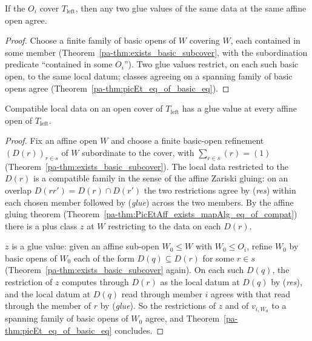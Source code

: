 \begin{theorem}
  \label{pa-thm:picEt_glueValue_unique}
  \leanok

  If the \(O_i\) cover \(T_{\mathrm{left}}\), then any two glue values of the same data at
  the same affine open agree.
\end{theorem}
\begin{proof}
  \leanok
  Choose a finite family of basic opens of \(W\) covering \(W\), each contained in some
  member (Theorem~\ref{pa-thm:exists_basic_subcover}, with the subordination predicate
  ``contained in some \(O_i\)''). Two glue values restrict, on each such basic open, to the
  same local datum; classes agreeing on a spanning family of basic opens agree
  (Theorem~\ref{pa-thm:picEt_eq_of_basic_eq}).
\end{proof}

\begin{theorem}
  \label{pa-thm:picEt_exists_isGlueValue}
  \leanok

  Compatible local data on an open cover of \(T_{\mathrm{left}}\) has a glue value at every
  affine open of \(T_{\mathrm{left}}\).
\end{theorem}
\begin{proof}
  \leanok
  Fix an affine open \(W\) and choose a finite basic-open refinement \((D(r))_{r \in s}\) of
  \(W\) subordinate to the cover, with \(\sum_{r \in s}(r) = (1)\)
  (Theorem~\ref{pa-thm:exists_basic_subcover}). The local data restricted to the \(D(r)\) is a
  compatible family in the sense of the affine Zariski gluing: on an overlap
  \(D(rr') = D(r) \cap D(r')\) the two restrictions agree by (\emph{res}) within each
  chosen member followed by (\emph{glue}) across the two members. By the affine gluing
  theorem (Theorem~\ref{pa-thm:PicEtAff_exists_mapAlg_eq_of_compat}) there is a plus class
  \(z\) at \(W\) restricting to the data on each \(D(r)\).

  \(z\) is a glue value: given an affine sub-open \(W_0 \le W\) with \(W_0 \le O_i\), refine
  \(W_0\) by basic opens of \(W_0\) each of the form \(D(q) \subseteq D(r)\) for some
  \(r \in s\) (Theorem~\ref{pa-thm:exists_basic_subcover} again). On each such \(D(q)\), the
  restriction of \(z\) computes through \(D(r)\) as the local datum at \(D(q)\) by
  (\emph{res}), and the local datum at \(D(q)\) read through member \(i\) agrees with that
  read through the member of \(r\) by (\emph{glue}). So the restrictions of \(z\) and of
  \(v_{i,W_0}\) to a spanning family of basic opens of \(W_0\) agree, and
  Theorem~\ref{pa-thm:picEt_eq_of_basic_eq} concludes.
\end{proof}

